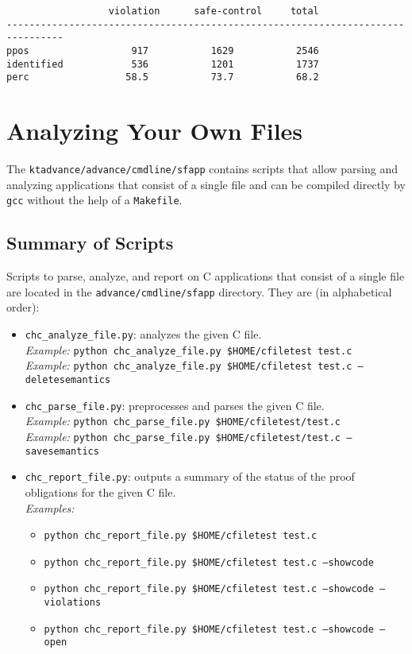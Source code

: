 \documentclass[11pt]{article}
\begin{document}
\begin{scriptsize}
\begin{verbatim}
                  violation      safe-control     total
--------------------------------------------------------------------------------
ppos                  917           1629           2546
identified            536           1201           1737
perc                 58.5           73.7           68.2

\end{verbatim}
\end{scriptsize}

\section{Analyzing Your Own Files}
\label{sec:sfapp}

The {\tt ktadvance/advance/cmdline/sfapp} contains scripts that allow parsing and
analyzing applications that consist of a single file and can be compiled directly
by {\tt gcc} without the help of a {\tt Makefile}.

\subsection{Summary of Scripts}

Scripts to parse, analyze, and report on C applications that consist of a single file
are located in the {\tt advance/cmdline/sfapp} directory. They are (in alphabetical
order):
\begin{itemize}[leftmargin=*]
\item {\tt chc\_analyze\_file.py}: analyzes the given C file.\\
\emph{Example:} {\tt python chc\_analyze\_file.py \$HOME/cfiletest test.c} \\
\emph{Example:} {\tt python chc\_analyze\_file.py \$HOME/cfiletest test.c --deletesemantics}
\item {\tt chc\_parse\_file.py}: preprocesses and parses the given C file.\\
\emph{Example:} {\tt python chc\_parse\_file.py \$HOME/cfiletest/test.c} \\
\emph{Example:} {\tt python chc\_parse\_file.py \$HOME/cfiletest/test.c --savesemantics}
\item {\tt chc\_report\_file.py}: outputs a summary of the status of the proof obligations
  for the given C file.\\
\emph{Examples:} 
\begin{itemize}[leftmargin=*]
\item {\tt python chc\_report\_file.py \$HOME/cfiletest test.c}
\item {\tt python chc\_report\_file.py \$HOME/cfiletest test.c --showcode}
\item {\tt python chc\_report\_file.py \$HOME/cfiletest test.c --showcode --violations}
\item {\tt python chc\_report\_file.py \$HOME/cfiletest test.c --showcode --open}
\end{itemize}
\end{itemize}
\end{document}
